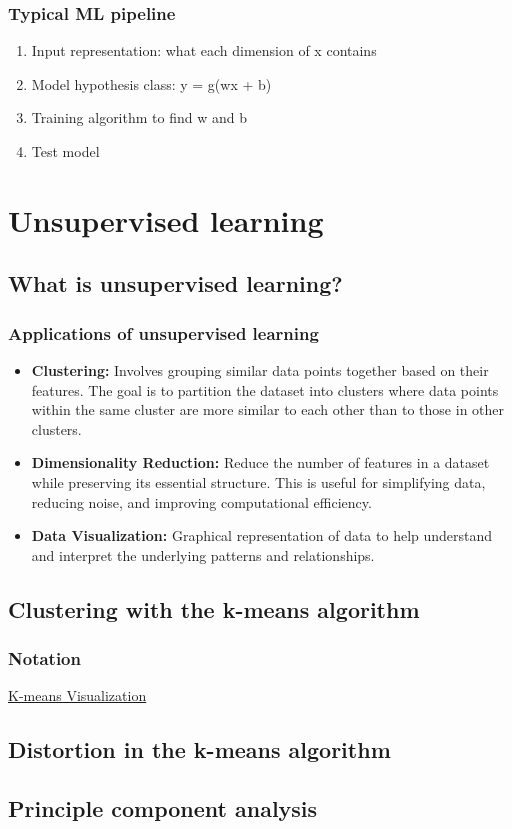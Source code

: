         \subsubsection{Typical ML pipeline}
            \begin{process}
                \begin{enumerate}
                    \item Input representation: what each dimension of x contains
                    \item Model hypothesis class: y = g(wx + b)
                    \item Training algorithm to find w and b
                    \item Test model
                \end{enumerate}
            \end{process}

\section{Unsupervised learning}
    \subsection{What is unsupervised learning?}
        \subsubsection{Applications of unsupervised learning}
            \begin{definition}
                \begin{itemize}
                    \item \textbf{Clustering:} Involves grouping similar data points together based on their features. The goal is to partition the dataset into clusters where data points within the same cluster are more similar to each other than to those in other clusters.
                    \item \textbf{Dimensionality Reduction:} Reduce the number of features in a dataset while preserving its essential structure. This is useful for simplifying data, reducing noise, and improving computational efficiency. 
                    \item \textbf{Data Visualization:} Graphical representation of data to help understand and interpret the underlying patterns and relationships. 
                \end{itemize}
            \end{definition}

    \subsection{Clustering with the k-means algorithm}
        \subsubsection{Notation}
            \href{http://shabal.in/visuals/kmeans/6.html}{K-means Visualization}


    \subsection{Distortion in the k-means algorithm}

    \subsection{Principle component analysis}
